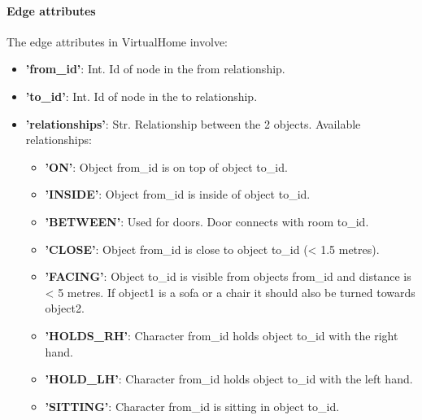 \paragraph{Edge attributes} The edge attributes in VirtualHome involve:
\begin{itemize}
    \item \textbf{'from\_id'}: Int. Id of node in the from relationship.
    \item \textbf{'to\_id'}: Int. Id of node in the to relationship.
    \item \textbf{'relationships'}: Str. Relationship between the 2 objects. Available relationships:
    \begin{itemize}
        \item \textbf{'ON'}: Object from\_id is on top of object to\_id.
        \item \textbf{'INSIDE'}: Object from\_id is inside of object to\_id.
        \item \textbf{'BETWEEN'}: Used for doors. Door connects with room to\_id.
        \item \textbf{'CLOSE'}: Object from\_id is close to object to\_id (< 1.5 metres).
        \item \textbf{'FACING'}: Object to\_id is visible from objects from\_id and distance is < 5 metres. If object1 is a sofa or a chair it should also be turned towards object2.
        \item \textbf{'HOLDS\_RH'}: Character from\_id holds object to\_id with the right hand.
        \item \textbf{'HOLD\_LH'}: Character from\_id holds object to\_id with the left hand.
        \item \textbf{'SITTING'}: Character from\_id is sitting in object to\_id.
    \end{itemize}
\end{itemize}

